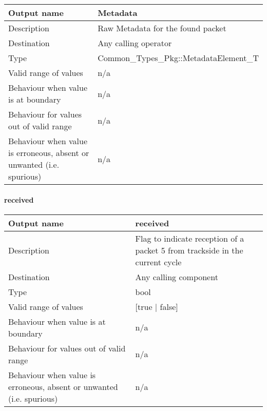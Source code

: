 \begin{longtable}{p{}p{}}
\toprule
Output name				& Metadata \\
\midrule
Description				& Raw Metadata for the found packet \\
\midrule
Destination				& Any calling operator\\ 
\midrule
Type					& Common\_Types\_Pkg::MetadataElement\_T\\
\midrule
Valid range of values	& n/a 

 \\
\midrule
Behaviour when value is at boundary	& n/a \\
\midrule
Behaviour for values out of valid range	& n/a\newline


 \\
\midrule
Behaviour when value is erroneous, absent or unwanted (i.e. spurious) & n/a \\
\bottomrule
\end{longtable}


\paragraph{received}

\begin{longtable}{p{}p{}}
\toprule
Output name				& received \\
\midrule
Description				& Flag to indicate reception of a packet 5 from trackside in the current cycle \\
\midrule
Destination				& Any calling component\\ 
\midrule
Type					& bool \\
\midrule
Valid range of values	&
[true | false]
 \\
\midrule
Behaviour when value is at boundary	& n/a \\
\midrule
Behaviour for values out of valid range	& n/a \\
\midrule
Behaviour when value is erroneous, absent or unwanted (i.e. spurious) & n/a\\
\bottomrule
\end{longtable}




%
